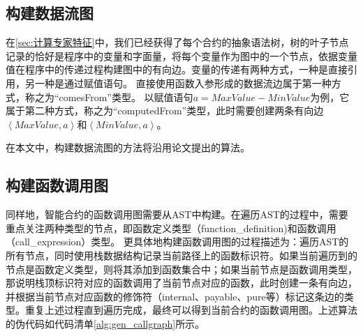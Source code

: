 \subsection{构建数据流图}
\label{sec:构建数据流图}
在\autoref{sec:计算专家特征}中，我们已经获得了每个合约的抽象语法树，树的叶子节点记录的恰好是程序中的变量和字面量，将每个变量作为图中的一个节点，依据变量值在程序中的传递过程构建图中的有向边。变量的传递有两种方式，一种是直接引用，另一种是通过赋值语句。
直接使用函数入参形成的数据流边属于第一种方式，称之为“comesFrom”类型。
以赋值语句$a=MaxValue-MinValue$为例，它属于第二种方式，称之为“computedFrom”类型，此时需要创建两条有向边$\left\langle MaxValue,a\right\rangle$和$\left\langle MinValue,a\right\rangle$。

在本文中，构建数据流图的方法将沿用论文\cite{wu2021peculiar}提出的算法。
\subsection{构建函数调用图}
\label{sec:构建函数调用图}
同样地，智能合约的函数调用图需要从AST中构建。在遍历AST的过程中，需要重点关注两种类型的节点，即函数定义类型（function\_definition)和函数调用（call\_expression）类型。
更具体地构建函数调用图的过程描述为：遍历AST的所有节点，同时使用栈数据结构记录当前路径上的函数标识符。如果当前遍历到的节点是函数定义类型，则将其添加到函数集合中；如果当前节点是函数调用类型，那说明栈顶标识符对应的函数调用了当前节点对应的函数，此时创建一条有向边，并根据当前节点对应函数的修饰符（internal、payable、pure等）标记这条边的类型。重复上述过程直到遍历完成，最终可以得到当前合约的函数调用图。上述算法的伪代码如代码清单\ref{alg:gen_callgraph}所示。


